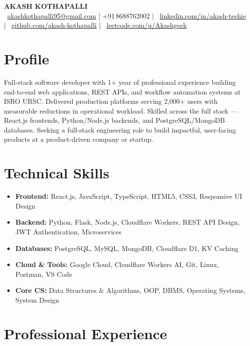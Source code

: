 \documentclass[a4paper,10pt]{article}
\newcommand{\iconbadge}[1]{%
  \tikz[baseline=-0.55ex]{\node[circle,fill=myblue,text=white,font=\bfseries\fontsize{5}{5}\selectfont,inner sep=1.3pt,minimum size=10pt]{#1};}%
}
\begin{document}
\begin{center}
  {\LARGE \textbf{AKASH KOTHAPALLI}}\\[5pt]
  {\small
    \iconbadge{@}~\href{mailto:akashkothapalli95@gmail.com}{akashkothapalli95@gmail.com}
    \enspace\textcolor{myblue}{|}\enspace
    +91\,8688762002
    \enspace\textcolor{myblue}{|}\enspace
    \iconbadge{in}~\href{https://www.linkedin.com/in/akash-techie}{linkedin.com/in/akash-techie}
    \enspace\textcolor{myblue}{|}\enspace
    \iconbadge{gh}~\href{https://github.com/akash-kothapalli}{github.com/akash-kothapalli}
    \enspace\textcolor{myblue}{|}\enspace
    \iconbadge{lc}~\href{https://leetcode.com/u/Akashgeek}{leetcode.com/u/Akashgeek}
  }
\end{center}

\section*{Profile}
Full-stack software developer with 1+ year of professional experience building end-to-end web applications, REST APIs, and workflow automation systems at ISRO URSC. Delivered production platforms serving 2,000+ users with measurable reductions in operational workload. Skilled across the full stack --- React.js frontends, Python/Node.js backends, and PostgreSQL/MongoDB databases. Seeking a full-stack engineering role to build impactful, user-facing products at a product-driven company or startup.

\section*{Technical Skills}
\begin{itemize}
\item \textbf{Frontend:} React.js, JavaScript, TypeScript, HTML5, CSS3, Responsive UI Design
\item \textbf{Backend:} Python, Flask, Node.js, Cloudflare Workers, REST API Design, JWT Authentication, Microservices
\item \textbf{Databases:} PostgreSQL, MySQL, MongoDB, Cloudflare D1, KV Caching
\item \textbf{Cloud \& Tools:} Google Cloud, Cloudflare Workers AI, Git, Linux, Postman, VS Code
\item \textbf{Core CS:} Data Structures \& Algorithms, OOP, DBMS, Operating Systems, System Design
\end{itemize}

\section*{Professional Experience}
\end{document}
